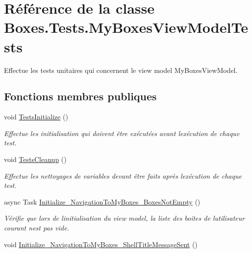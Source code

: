 \hypertarget{class_boxes_1_1_tests_1_1_my_boxes_view_model_tests}{}\section{Référence de la classe Boxes.\+Tests.\+My\+Boxes\+View\+Model\+Tests}
\label{class_boxes_1_1_tests_1_1_my_boxes_view_model_tests}


Effectue les tests unitaires qui concernent le view model My\+Boxes\+View\+Model.  


\subsection*{Fonctions membres publiques}
\begin{DoxyCompactItemize}
\item 
void \hyperlink{class_boxes_1_1_tests_1_1_my_boxes_view_model_tests_a680d5f78096155886d525c3d2c1a658c}{Tests\+Initialize} ()
\begin{DoxyCompactList}\small\item\em Effectue les initialisation qui doivent être exécutées avant l\textquotesingle{}exécution de chaque test. \end{DoxyCompactList}\item 
void \hyperlink{class_boxes_1_1_tests_1_1_my_boxes_view_model_tests_a2a9d9ea8b066bbc498e1e00128e5b440}{Tests\+Cleanup} ()
\begin{DoxyCompactList}\small\item\em Effectue les nettoyages de variables devant être faits après l\textquotesingle{}exécution de chaque test. \end{DoxyCompactList}\item 
async Task \hyperlink{class_boxes_1_1_tests_1_1_my_boxes_view_model_tests_a61400a7a02c4ec43feaa50a700f02f4f}{Initialize\+\_\+\+Navigation\+To\+My\+Boxes\+\_\+\+Boxes\+Not\+Empty} ()
\begin{DoxyCompactList}\small\item\em Vérifie que lors de l\textquotesingle{}initialisation du view model, la liste des boites de l\textquotesingle{}utilisateur courant n\textquotesingle{}est pas vide. \end{DoxyCompactList}\item 
void \hyperlink{class_boxes_1_1_tests_1_1_my_boxes_view_model_tests_acb622867fed67cca523d5be15800749b}{Initialize\+\_\+\+Navigation\+To\+My\+Boxes\+\_\+\+Shell\+Title\+Message\+Sent} ()

\end{DoxyCompactItemize}
